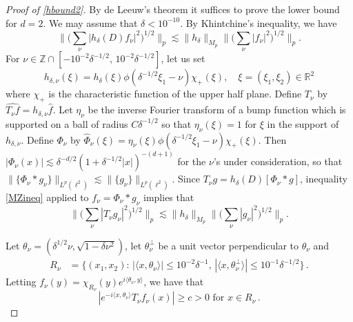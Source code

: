 \documentclass[11pt]{amsart}
\theoremstyle{definition}
\numberwithin{theorem}{section}
\numberwithin{definition}{section}
\numberwithin{equation}{section}
\def\inn#1#2{\langle#1,#2\rangle}
\newcommand{\Be}{\begin{equation}}
\newcommand{\Ee}{\end{equation}}
\renewcommand{\le}{\leqslant}
\renewcommand{\ge}{\geqslant}
\def\inn#1#2{\langle#1,#2\rangle}
\def\lc{\lesssim}
\renewcommand{\le}{\leqslant}
\renewcommand{\ge}{\geqslant}
\begin{document}
\begin{proof}[Proof of \eqref{hbound2}]
By de Leeuw's theorem it suffices to prove the lower bound for $d=2$.
We may assume that $\delta<10^{-10}$. By Khintchine's inequality, we have
\begin{equation}\label{MZineq}\Big\|\big(\sum_\nu \big| h_\delta(D)  f_\nu\big|^2\big)^{1/2}
\Big\|_p \lc \|h_\delta\|_{M_p}
\Big\|\big(\sum_\nu |f_\nu|^2\big)^{1/2}\Big\|_p.
\end{equation}
For $\nu\in \mathbb Z\cap [-10^{-2}\delta^{-1/2}, \, 10^{-2}\delta^{-1/2}]$, let us set
\[h_{\delta,\nu}(\xi)= h_\delta(\xi) \phi(\delta^{-1/2}\xi_1-\nu)
\chi_{+}(\xi), \quad \xi=(\xi_1,\xi_2)\in \mathbb R^2\]
where $\chi_+ $ is the characteristic function of the upper half plane.
Define $T_\nu$ by $\widehat{T_\nu f}= h_{\delta,\nu}\widehat f$.
Let $\eta_\nu$ be the inverse Fourier transform of a  bump function which is
 supported on a ball of radius $C\delta^{-1/2}$ so that $\eta_\nu(\xi)=1$ for $\xi$ in  the support of
 $h_{\delta,\nu}$. Define  $\Phi_\nu$ by
$\widehat\Phi_\nu (\xi)=\eta_\nu(\xi)\phi(\delta^{-1/2}\xi_1-\nu)\chi_{+}(\xi)$.
Then
$|\Phi_\nu(x)|\lc\delta^{-d/2}(1+\delta^{-1/2}|x|)^{-{(d+1)}}$ for the $\nu$'s under consideration, so that
$\|\{\Phi_\nu*g_\nu\}\|_{L^p(\ell^2)}\lc
\|\{g_\nu\}\|_{L^p(\ell^2)}$.
Since $T_\nu g= h_\delta(D)[\Phi_\nu*g]$,
inequality \eqref{MZineq} applied to $f_\nu=\Phi_\nu*g_\nu$
implies that
\Be\label{mz}\Big\|\big(\sum_\nu |T_\nu g_\nu|^2\big)^{1/2}
\Big\|_p \lc \|h_\delta\|_{M_p}
\Big\|\big(\sum_\nu |g_\nu|^2\big)^{1/2}\Big\|_p.
\Ee

Let $\theta_\nu= (\delta^{1/2}\nu, \sqrt{1-\delta\nu^2})$, let $\theta_\nu^\perp$ be a unit vector perpendicular to $\theta_\nu$ and
\begin{align*} R_\nu&= \big\{(x_1,x_2): \,
|\inn{x}{\theta_\nu}|\le 10^{-2}\delta^{-1},\,
|\inn{x}{\theta_\nu^\perp}|\le 10^{-1}\delta^{-1/2}\big\}\,.
\end{align*}
Letting $f_\nu(y)=\chi_{R_\nu}(y)e^{i\inn{\theta_\nu}{y}}$, we have that
\Be \label{ptwlowerbound}
|e^{-i\inn {x}{\theta_\nu}}T_\nu f_\nu (x)|\ge c>0 \text{ for } x\in R_\nu\,.
\Ee


\end{proof}
\end{document}

